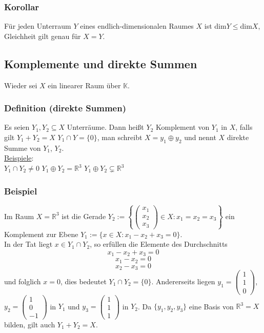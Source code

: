 \subsubsection{Korollar}
Für jeden Unterraum $Y$ eines endlich-dimensionalen Raumes $X$ ist dim$Y\leq$dim$X$, Gleichheit gilt genau für $X=Y$.
\subsection{Komplemente und direkte Summen}
Wieder sei $X$ ein linearer Raum über $\mathbb{K}$.
\subsubsection{Definition (direkte Summen)}
Es seien $Y_1,Y_2\subseteq X$ Unterräume. Dann heißt $Y_2$ Komplement von $Y_1$ in $X$, falls gilt $Y_1+Y_2=X$ $Y_1\cap Y=\{0\}$, man schreibt $X=y_1\oplus y_2$ und nennt $X$ direkte Summe von $Y_1$, $Y_2$.\\
\underline{Beispiele}:\\
$Y_1\cap Y_2 \neq 0$ $Y_1\oplus Y_2=\mathbb{R}^3$ $Y_1\oplus Y_2\subsetneq \mathbb{R}^3$
\subsubsection{Beispiel} 
Im Raum $X=\mathbb{R}^3$ ist die Gerade $Y_2:=\left\{\begin{pmatrix}x_1\\x_2\\x_3\end{pmatrix}\in X: x_1=x_2=x_3\right\}$ ein Komplement zur Ebene $Y_1:=\{x\in X: x_1-x_2+x_3=0\}$.\\
In der Tat liegt $x\in Y_1 \cap Y_2$, so erfüllen die Elemente des Durchschnitts\\
\[x_1-x_2+x_3=0\]
\[x_1-x_2=0\]
\[x_2-x_3=0\]
und folglich $x=0$, dies bedeutet $Y_1\cap Y_2=\{0\}$. Andererseits liegen $y_1=\begin{pmatrix}1\\1\\0\end{pmatrix}$, $y_2=\begin{pmatrix}1\\0\\-1\end{pmatrix}$ in $Y_1$ und $y_3=\begin{pmatrix}1\\1\\1\end{pmatrix}$ in $Y_2$. Da $\{y_1,y_2,y_3\}$ eine Basis von $\mathbb{R}^3=X$ bilden, gilt auch $Y_1+Y_2=X$.
